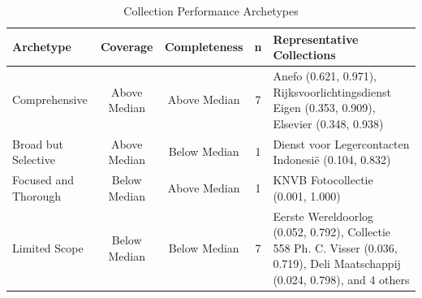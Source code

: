\documentclass[final]{anthology-ch}
\begin{document}
\begin{table}[h]
  \centering
  
  \begin{tabular}{lccc p{4cm}}
    \toprule
    \textbf{Archetype} & \textbf{Coverage} & \textbf{Completeness} & \textbf{n} & \textbf{Representative Collections} \\ 
    \midrule
    Comprehensive & Above Median & Above Median & 7 & Anefo (0.621, 0.971), Rijksvoorlichtingsdienst Eigen (0.353, 0.909), Elsevier (0.348, 0.938) \\ 
    Broad but Selective & Above Median & Below Median & 1 & Dienst voor Legercontacten Indonesië (0.104, 0.832) \\ 
    Focused and Thorough & Below Median & Above Median & 1 & KNVB Fotocollectie (0.001, 1.000) \\ 
    Limited Scope & Below Median & Below Median & 7 & Eerste Wereldoorlog (0.052, 0.792), Collectie 558 Ph. C. Visser (0.036, 0.719), Deli Maatschappij (0.024, 0.798), and 4 others \\ \bottomrule
  \end{tabular}
  \caption{Collection Performance Archetypes}
  \label{tab:collection_archetypes}
\end{table}
\end{document}
